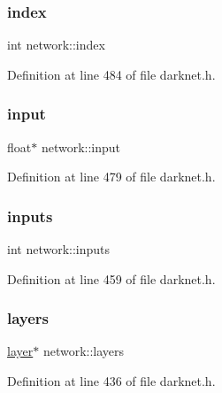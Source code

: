 \mbox{\label{structnetwork_a67a4b2779829a2891b1e3194b4910334}} 
\subsubsection{\texorpdfstring{index}{index}}
{\footnotesize\ttfamily int network\+::index}



Definition at line 484 of file darknet.\+h.

\mbox{\label{structnetwork_a8f391155a3ceb60caf07d0ee6c6a93f2}} 
\subsubsection{\texorpdfstring{input}{input}}
{\footnotesize\ttfamily float$\ast$ network\+::input}



Definition at line 479 of file darknet.\+h.

\mbox{\label{structnetwork_a529a36505548232d049abcb84fdcf389}} 
\subsubsection{\texorpdfstring{inputs}{inputs}}
{\footnotesize\ttfamily int network\+::inputs}



Definition at line 459 of file darknet.\+h.

\mbox{\label{structnetwork_a9770423f88b722bafc9d1fd3c6091d75}} 
\subsubsection{\texorpdfstring{layers}{layers}}
{\footnotesize\ttfamily \mbox{\hyperlink{structlayer}{layer}}$\ast$ network\+::layers}



Definition at line 436 of file darknet.\+h.

\mbox{\label{structnetwork_a978d3e339536cd6bea2270d49d93c35a}} 
